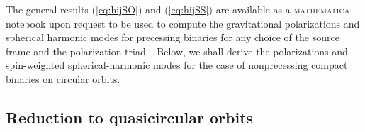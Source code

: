 \documentclass[aps, prd,
twocolumn,%
superscriptaddress,
showpacs, nofootinbib, eqsecnum, amsmath, amssymb, floatfix
]{revtex4}
\begin{document}
The general results (\ref{eq:hijSO}) and (\ref{eq:hijSS}) are
available as a \textsc{mathematica} notebook upon request to be used
to compute the gravitational polarizations and spherical harmonic
modes for precessing binaries for any choice of the source frame and
the polarization triad~\cite{Finn1993,
  Kidder:1995zr,Buonanno:2002fy,Schmidt:2010it,OShaughnessy2011, Ochsner2012,
  2011PhRvD..84l4011B,Schmidt:2012rh}. Below, we shall derive the
polarizations and spin-weighted spherical-harmonic modes for the
case of nonprecessing compact binaries on circular orbits.




\subsection{Reduction to quasicircular orbits}
\end{document}
